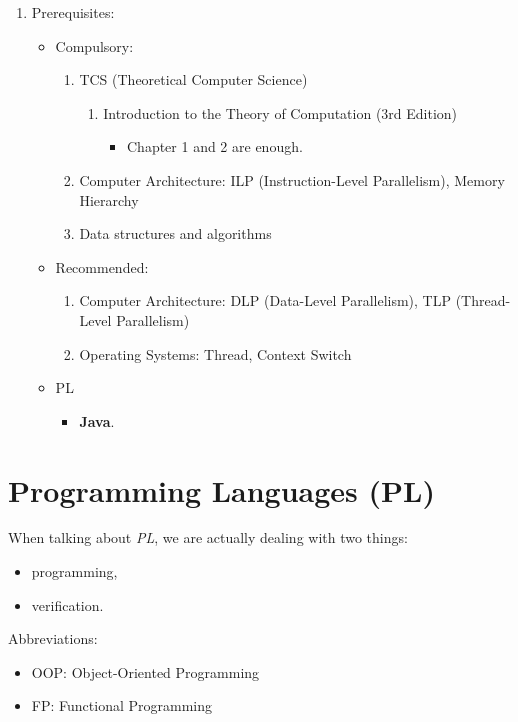 \documentclass{article}
\begin{document}
\begin{enumerate}
    \item Prerequisites:
    \begin{itemize}
        \item Compulsory:
        \begin{enumerate}
        \item TCS (Theoretical Computer Science)
        \begin{enumerate}
            \item Introduction to the Theory of Computation (3rd Edition) \cite{sipser1996introduction}
            \begin{itemize}
                \item Chapter 1 and 2 are enough.
            \end{itemize}
        \end{enumerate}
        \item Computer Architecture: ILP (Instruction-Level Parallelism), Memory Hierarchy
        \item Data structures and algorithms
    \end{enumerate}
        \item Recommended:
        \begin{enumerate}
            \item Computer Architecture: DLP (Data-Level Parallelism), TLP (Thread-Level Parallelism)
            \item Operating Systems: Thread, Context Switch
        \end{enumerate}
        \item PL
        \begin{itemize}
            \item \textbf{Java}.
        \end{itemize}
    \end{itemize}
\end{enumerate}

\section{Programming Languages (PL)}

When talking about \emph{PL}, we are actually dealing with two things:
\begin{itemize}
    \item programming,
    \item verification.
\end{itemize}

\noindent Abbreviations:
\begin{itemize}
    \item OOP: Object-Oriented Programming
    \item FP: Functional Programming
\end{itemize}
\end{document}
